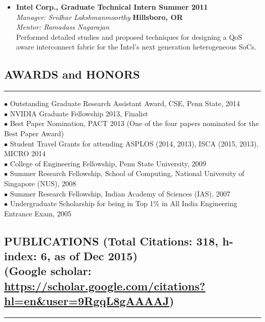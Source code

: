 \documentclass[10pt,a4]{article}
\begin{document}
\begin{itemize}
\item{\bf Intel Corp., Graduate Technical Intern \hfill {\bf Summer 2011}} \\
{\it Manager: Sridhar Lakshmanmoorthy}  \hfill {\bf Hillsboro, OR} \\ 
{\it Mentor: Ramadass Nagarajan}   \\
Performed detailed studies and proposed techniques for designing a QoS aware 
interconnect fabric for the Intel's next generation heterogeneous SoCs. 

\end{itemize}

\subsection*{AWARDS and HONORS}
\hrule
\vspace{0.2cm}

$\bullet$  Outstanding Graduate Research Assistant Award, CSE, Penn State, 2014 \\
$\bullet$  NVIDIA Graduate Fellowship 2013, Finalist \\
$\bullet$  Best Paper Nomination, PACT 2013 (One of the four papers nominated for the Best Paper Award) \\
$\bullet$  Student Travel Grants for attending ASPLOS (2014, 2013), ISCA (2015, 2013), MICRO 2014 \\
$\bullet$  College of Engineering Fellowship, Penn State University, 2009 \\
$\bullet$  Summer Research Fellowship, School of Computing, National University of Singapore (NUS), 2008 \\
$\bullet$  Summer Research Fellowship, Indian Academy of Sciences (IAS), 2007 \\
$\bullet$  Undergraduate Scholarship for being in Top 1\% in All India Engineering Entrance Exam, 2005

\subsection*{PUBLICATIONS (Total Citations: 318, h-index: 6, as of Dec 2015) \\ (Google scholar: \url{https://scholar.google.com/citations?hl=en&user=9RgqL8gAAAAJ}) }
\hrule
\vspace{0.2cm}
\end{document}
